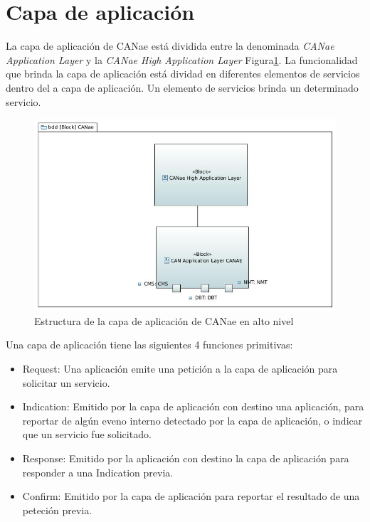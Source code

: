 \section{Capa de aplicación}
La capa de aplicación de CANae está dividida entre la denominada \textit{CANae Application Layer} y la \textit{CANae High Application Layer} Figura\ref{fig:CANAE}. La funcionalidad que brinda la capa de aplicación está dividad en diferentes elementos de servicios dentro del a capa de aplicación. Un elemento de servicios brinda un determinado servicio.

\begin{figure}[h!]
 \centering
 \includegraphics[scale=0.5]{images/Secciones/AppendixA/CANAE.JPG}
  \caption{Estructura de la capa de aplicación de CANae en alto nivel}
\label{fig:CANAE}
\end{figure}

Una capa de aplicación tiene las siguientes 4 funciones primitivas:
\begin{itemize}
\item Request: Una aplicación emite una petición a la capa de aplicación para solicitar un servicio.
  
\item Indication: Emitido por la capa de aplicación con destino una aplicación, para reportar de algún eveno interno detectado por la capa de aplicación, o indicar que un servicio fue solicitado.

\item Response: Emitido por la aplicación con destino la capa de aplicación para responder a una Indication previa.

\item Confirm: Emitido por la capa de aplicación para reportar el resultado de una peteción previa. 
\end{itemize}

